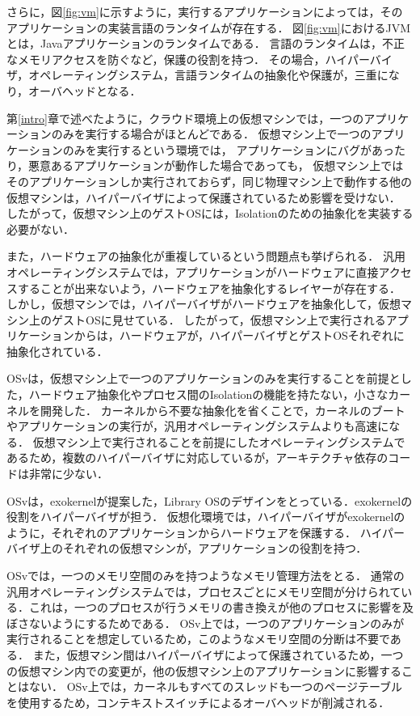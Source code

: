 \documentclass[graduation-thesis]{mlarticle}
\begin{document}
さらに，図\ref{fig:vm}に示すように，実行するアプリケーションによっては，そのアプリケーションの実装言語のランタイムが存在する．
図\ref{fig:vm}におけるJVMとは，Javaアプリケーションのランタイムである．
言語のランタイムは，不正なメモリアクセスを防ぐなど，保護の役割を持つ．
その場合，ハイパーバイザ，オペレーティングシステム，言語ランタイムの抽象化や保護が，三重になり，オーバヘッドとなる．

第\ref{intro}章で述べたように，クラウド環境上の仮想マシンでは，一つのアプリケーションのみを実行する場合がほとんどである．
仮想マシン上で一つのアプリケーションのみを実行するという環境では，
アプリケーションにバグがあったり，悪意あるアプリケーションが動作した場合であっても，
仮想マシン上ではそのアプリケーションしか実行されておらず，同じ物理マシン上で動作する他の仮想マシンは，ハイパーバイザによって保護されているため影響を受けない．
したがって，仮想マシン上のゲストOSには，Isolationのための抽象化を実装する必要がない．

また，ハードウェアの抽象化が重複しているという問題点も挙げられる．
汎用オペレーティングシステムでは，アプリケーションがハードウェアに直接アクセスすることが出来ないよう，ハードウェアを抽象化するレイヤーが存在する．
しかし，仮想マシンでは，ハイパーバイザがハードウェアを抽象化して，仮想マシン上のゲストOSに見せている．
したがって，仮想マシン上で実行されるアプリケーションからは，ハードウェアが，ハイパーバイザとゲストOSそれぞれに抽象化されている．

OSvは，仮想マシン上で一つのアプリケーションのみを実行することを前提とした，ハードウェア抽象化やプロセス間のIsolationの機能を持たない，小さなカーネルを開発した．
カーネルから不要な抽象化を省くことで，カーネルのブートやアプリケーションの実行が，汎用オペレーティングシステムよりも高速になる．
仮想マシン上で実行されることを前提にしたオペレーティングシステムであるため，複数のハイパーバイザに対応しているが，アーキテクチャ依存のコードは非常に少ない．

OSvは，exokernelが提案した，Library OSのデザインをとっている．exokernelの役割をハイパーバイザが担う．
仮想化環境では，ハイパーバイザがexokernelのように，それぞれのアプリケーションからハードウェアを保護する．
ハイパーバイザ上のそれぞれの仮想マシンが，アプリケーションの役割を持つ．

OSvでは，一つのメモリ空間のみを持つようなメモリ管理方法をとる．
通常の汎用オペレーティングシステムでは，プロセスごとにメモリ空間が分けられている．これは，一つのプロセスが行うメモリの書き換えが他のプロセスに影響を及ぼさないようにするためである．
OSv上では，一つのアプリケーションのみが実行されることを想定しているため，このようなメモリ空間の分断は不要である．
また，仮想マシン間はハイパーバイザによって保護されているため，一つの仮想マシン内での変更が，他の仮想マシン上のアプリケーションに影響することはない．
OSv上では，カーネルもすべてのスレッドも一つのページテーブルを使用するため，コンテキストスイッチによるオーバヘッドが削減される．
\end{document}
